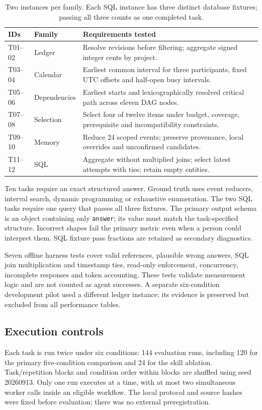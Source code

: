 \begin{table}[htbp]
\centering\small
\begin{tabular}{@{}lp{28mm}p{101mm}@{}}
\toprule
\textbf{IDs} & \textbf{Family} & \textbf{Requirements tested}\\
\midrule
T01--02 & Ledger & Resolve revisions before filtering; aggregate signed integer cents by project.\\
T03--04 & Calendar & Earliest common interval for three participants, fixed UTC offsets and half-open busy intervals.\\
T05--06 & Dependencies & Earliest starts and lexicographically resolved critical path across eleven DAG nodes.\\
T07--08 & Selection & Select four of twelve items under budget, coverage, prerequisite and incompatibility constraints.\\
T09--10 & Memory & Reduce 24 scoped events; preserve provenance, local overrides and unconfirmed candidates.\\
T11--12 & SQL & Aggregate without multiplied joins; select latest attempts with ties; retain empty entities.\\
\bottomrule
\end{tabular}
\caption{Two instances per family. Each SQL instance has three distinct database fixtures; passing all three counts as one completed task.}
\label{tab:tasks}
\end{table}

Ten tasks require an exact structured answer. Ground truth uses event reducers, interval search, dynamic programming or exhaustive enumeration. The two SQL tasks require one query that passes all three fixtures. The primary output schema is an object containing only \texttt{answer}; its value must match the task-specified structure. Incorrect shapes fail the primary metric even when a person could interpret them. SQL fixture pass fractions are retained as secondary diagnostics.

Seven offline harness tests cover valid references, plausible wrong answers, SQL join multiplication and timestamp ties, read-only enforcement, concurrency, incomplete responses and token accounting. These tests validate measurement logic and are not counted as agent successes. A separate six-condition development pilot used a different ledger instance; its evidence is preserved but excluded from all performance tables.

\subsection{Execution controls}
Each task is run twice under six conditions: 144 evaluation runs, including 120 for the primary five-condition comparison and 24 for the skill ablation. Task/repetition blocks and condition order within blocks are shuffled using seed 20260913. Only one run executes at a time, with at most two simultaneous worker calls inside an eligible workflow. The local protocol and source hashes were fixed before evaluation; there was no external preregistration.

